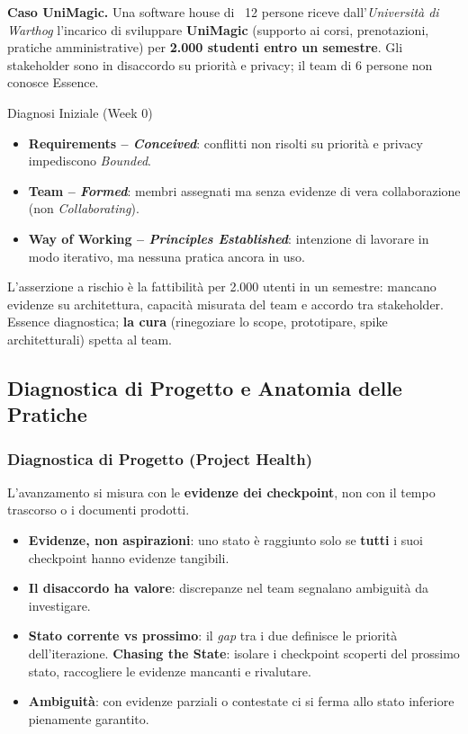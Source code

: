 \documentclass[12pt]{extarticle}
\begin{document}
\medskip
\noindent \textbf{Caso UniMagic.} Una software house di ~12 persone riceve dall'\textit{Università di Warthog} l'incarico di sviluppare \textbf{UniMagic} (supporto ai corsi, prenotazioni, pratiche amministrative) per \textbf{2.000 studenti entro un semestre}. Gli stakeholder sono in disaccordo su priorità e privacy; il team di 6 persone non conosce Essence.

\begin{cbox}{Diagnosi Iniziale (Week 0)}
\begin{itemize}
    \item \textbf{Requirements -- \textit{Conceived}}: conflitti non risolti su priorità e privacy impediscono \textit{Bounded}.
    \item \textbf{Team -- \textit{Formed}}: membri assegnati ma senza evidenze di vera collaborazione (non \textit{Collaborating}).
    \item \textbf{Way of Working -- \textit{Principles Established}}: intenzione di lavorare in modo iterativo, ma nessuna pratica ancora in uso.
\end{itemize}
\end{cbox}

\noindent L'asserzione a rischio è la fattibilità per 2.000 utenti in un semestre: mancano evidenze su architettura, capacità misurata del team e accordo tra stakeholder. Essence diagnostica; \textbf{la cura} (rinegoziare lo scope, prototipare, spike architetturali) spetta al team.

\subsection{Diagnostica di Progetto e Anatomia delle Pratiche}
\subsubsection{Diagnostica di Progetto (Project Health)}
\noindent L'avanzamento si misura con le \textbf{evidenze dei checkpoint}, non con il tempo trascorso o i documenti prodotti.
\begin{itemize}
    \item \textbf{Evidenze, non aspirazioni}: uno stato è raggiunto solo se \textbf{tutti} i suoi checkpoint hanno evidenze tangibili.
    \item \textbf{Il disaccordo ha valore}: discrepanze nel team segnalano ambiguità da investigare.
    \item \textbf{Stato corrente vs prossimo}: il \textit{gap} tra i due definisce le priorità dell'iterazione. \textbf{Chasing the State}: isolare i checkpoint scoperti del prossimo stato, raccogliere le evidenze mancanti e rivalutare.
    \item \textbf{Ambiguità}: con evidenze parziali o contestate ci si ferma allo stato inferiore pienamente garantito.
\end{itemize}
\end{document}

